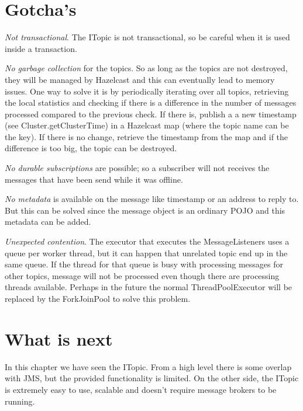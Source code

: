 \section{Gotcha's}

\emph{Not transactional}. The ITopic is not transactional, so be careful when it is used inside a transaction.

\emph{No garbage collection} for the topics. So as long as the topics are not destroyed, they will be managed by Hazelcast and this can eventually lead to memory issues. One way to solve it is by periodically iterating over all topics, retrieving the local statistics and checking if there is a difference in the number of messages processed compared to the previous check. If there is, publish a a new timestamp (see Cluster.getClusterTime) in a Hazelcast map (where the topic name can be the key). If there is no change, retrieve the timestamp from the map and if the difference is too big, the topic can be destroyed.

\emph{No durable subscriptions} are possible; so a subscriber will not receives the messages that have been send while it was offline.

\emph{No metadata} is available on the message like timestamp or an address to reply to. But this can be solved since the message object is an ordinary POJO and this metadata can be added.

\emph{Unexpected contention}. The executor that executes the MessageListeners uses a queue per worker thread, but it can happen that unrelated topic end up in the same queue. If the thread for that queue is busy with processing messages for other topics, message will not be processed even though there are processing threads available. Perhaps in the future the normal ThreadPoolExecutor will be replaced by the ForkJoinPool to solve this problem.

\section{What is next}
In this chapter we have seen the ITopic. From a high level there is some overlap with JMS, but the provided functionality is limited. On the other side, the ITopic is extremely easy to use, scalable and doesn't require message brokers to be running.
